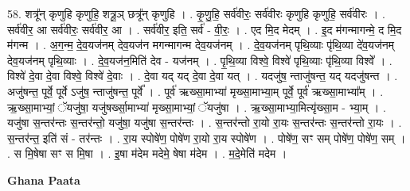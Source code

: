 \documentclass[17pt]{extarticle}
\begin{document}
58. शत्रू᳚न् कृणुहि कृणुहि॒ शत्रू॒ञ् छत्रू᳚न् कृणुहि । . कृ॒णु॒हि॒ सर्व॑वीरः॒ सर्व॑वीरः कृणुहि कृणुहि॒ सर्व॑वीरः । . सर्व॑वीर॒ आ सर्व॑वीरः॒ सर्व॑वीर॒ आ । . सर्व॑वीर॒ इति॒ सर्व॑ - वी॒रः॒ । . एद मि॒द मेदम् । . इ॒द म॑गन्मागन्मे॒ द मि॒द म॑गन्म । . अ॒ग॒न्म॒ दे॒व॒यज॑नम् देव॒यज॑न मगन्मागन्म देव॒यज॑नम् । . दे॒व॒यज॑नम् पृथि॒व्याः पृ॑थि॒व्या दे॑व॒यज॑नम् देव॒यज॑नम् पृथि॒व्याः । . दे॒व॒यज॑न॒मिति॑ देव - यज॑नम् । . पृ॒थि॒व्या विश्वे॒ विश्वे॑ पृथि॒व्याः पृ॑थि॒व्या विश्वे᳚ । . विश्वे॑ दे॒वा दे॒वा विश्वे॒ विश्वे॑ दे॒वाः । . दे॒वा यद् यद् दे॒वा दे॒वा यत् । . यदजु॑ष॒ न्ताजु॑षन्त॒ यद् यदजु॑षन्त । . अजु॑षन्त॒ पूर्वे॒ पूर्वे ऽजु॑ष॒ न्ताजु॑षन्त॒ पूर्वे᳚ । . पूर्व॑ ऋख्सा॒माभ्या॑ मृख्सा॒माभ्या॒म् पूर्वे॒ पूर्व॑ ऋख्सा॒माभ्या᳚म् । . ऋ॒ख्सा॒माभ्यां॒ ॅयजु॑षा॒ यजु॑षर्ख्सा॒माभ्या॑ मृख्सा॒माभ्यां॒ ॅयजु॑षा । . ऋ॒ख्सा॒माभ्या॒मित्यृ॑ख्सा॒म - भ्या॒म् । . यजु॑षा स॒न्तर॑न्तः स॒न्तर॑न्तो॒ यजु॑षा॒ यजु॑षा स॒न्तर॑न्तः । . स॒न्तर॑न्तो रा॒यो रा॒यः स॒न्तर॑न्तः स॒न्तर॑न्तो रा॒यः । . स॒न्तर॑न्त॒ इति॑ सं - तर॑न्तः । . रा॒य स्पोषे॑ण॒ पोषे॑ण रा॒यो रा॒य स्पोषे॑ण । . पोषे॑ण॒ सꣳ सम् पोषे॑ण॒ पोषे॑ण॒ सम् । . स मि॒षेषा सꣳ स मि॒षा । . इ॒षा म॑देम मदेमे॒ षेषा म॑देम । . म॒दे॒मेति॑ मदेम । \newline

\textbf{Ghana Paata } \newline
\end{document}
